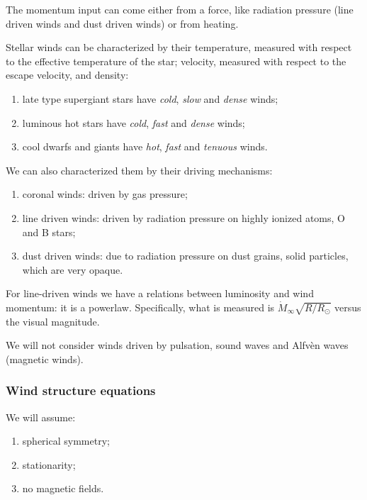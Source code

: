 \documentclass[main.tex]{subfiles}
\begin{document}

The momentum input can come either from a force, like radiation pressure (line driven winds and dust driven winds) or from heating.

Stellar winds can be characterized by their temperature, measured with respect to the effective temperature of the star; velocity, measured with respect to the escape velocity, and density: 
\begin{enumerate}
  \item late type supergiant stars have \emph{cold},  \emph{slow} and \emph{dense} winds;
  \item luminous hot stars have \emph{cold}, \emph{fast} and \emph{dense} winds;
  \item cool dwarfs and giants have \emph{hot}, \emph{fast} and \emph{tenuous} winds.
\end{enumerate}

We can also characterized them by their driving mechanisms:
\begin{enumerate}
    \item coronal winds: driven by gas pressure;
    \item line driven winds: driven by radiation pressure on highly ionized atoms, O and B stars;
    \item dust driven winds: due to radiation pressure on dust grains, solid particles, which are very opaque.
\end{enumerate}

For line-driven winds we have a relations between luminosity and wind momentum: it is a powerlaw. 
Specifically, what is measured is \(\dot{M}_{ \infty } \sqrt{R / R_{\odot}}\) versus the visual magnitude. 

We will not consider winds driven by pulsation, sound waves and Alfvèn waves (magnetic winds).

\subsubsection{Wind structure equations}

We will assume:
\begin{enumerate}
    \item spherical symmetry;
    \item stationarity;
    \item no magnetic fields.
\end{enumerate}
\end{document}

